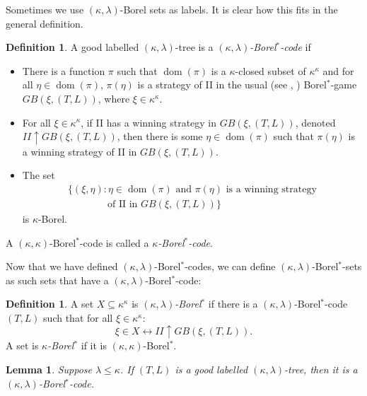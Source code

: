 \documentclass[12pt,a4paper]{amsart}
\newtheorem{lemma}[thm]{Lemma}
\theoremstyle{definition}
\newtheorem{defn}[thm]{Definition}
\theoremstyle{remark}
\DeclareMathOperator{\dom}{dom}
\def\borelstar{Borel\nobreak\hspace{1pt}$^*$}
\begin{document}
Sometimes we use $(\kappa,\lambda)$-Borel sets as labels. It is clear how this fits in the general definition.

\begin{defn}\label{Borel_star}
A good labelled $(\kappa,\lambda)$-tree is a \emph{$(\kappa,\lambda)$-\borelstar-code} if 
\begin{itemize}
\item [(i)] There is a function $\pi$ such that $\dom(\pi)$ is a $\kappa$-closed subset of $\kappa^\kappa$ and for all $\eta\in \dom(\pi)$, $\pi(\eta)$ is a strategy of II in the usual (see \cite{MR1242054}, \cite{MR3753133}) \borelstar-game $GB(\xi,(T,L))$, where $\xi\in\kappa^\kappa$.
\item [(ii)] For all $\xi\in\kappa^\kappa$, if II has a winning strategy in $GB(\xi,(T,L))$, denoted $II\uparrow GB(\xi,(T,L))$, then there is some $\eta\in\dom(\pi)$ such that $\pi(\eta)$ is a winning strategy of II in $GB(\xi,(T,L))$.
\item [(iii)] The set $$\begin{array}{l}
\{(\xi,\eta) : \eta\in\dom(\pi)\text{ and }\pi(\eta)\mbox{ is a winning strategy}\\ \qquad\qquad\text{of II in }GB(\xi,(T,L))\}\end{array}$$ is $\kappa$-Borel.
\end{itemize} A $(\kappa,\kappa)$-\borelstar-code is called a \emph{$\kappa$-\borelstar-code}.
\end{defn}

Now that we have defined $(\kappa,\lambda)$-\borelstar-codes, we can define $(\kappa,\lambda)$-\borelstar-sets as such sets that have a $(\kappa,\lambda)$-\borelstar-code:

\begin{defn}\label{def_Borel_star}
A set $X\subseteq \kappa^\kappa$ is \emph{$(\kappa,\lambda)$-\borelstar} if there is a $(\kappa,\lambda)$-\borelstar-code $(T,L)$  such that for all $\xi\in\kappa^\kappa$: 
$$\xi\in X\leftrightarrow II\uparrow GB(\xi,(T,L)).$$ A set is \emph{$\kappa$-\borelstar} if it is $(\kappa,\kappa)$-\borelstar.
\end{defn}

\begin{lemma}\label{labelled_to_Borel}
Suppose $\lambda\leq\kappa$. 
If $(T,L)$ is a good labelled $(\kappa,\lambda)$-tree, then it is a $(\kappa,\lambda)$-{\borelstar}-code.
\end{lemma}
\end{document}
